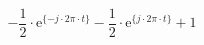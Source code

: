 \[
-\frac{1}{2}\cdot\textrm{e}^{\{-j \cdot 2\pi \cdot t \}}
-\frac{1}{2}\cdot\textrm{e}^{\{ j \cdot 2\pi \cdot t \}}
+1
\]
